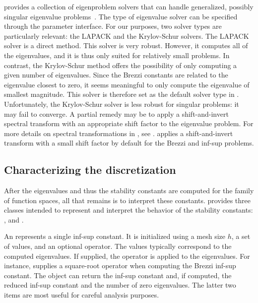 \slepc{} provides a collection of eigenproblem solvers that can handle
generalized, possibly singular eigenvalue
problems~\citep{HernandezRomanVidal2005, HernandezRomanRomeroEtAl2009}. The type
of eigenvalue solver can be specified through the \dolfin{} parameter
interface. For our purposes, two solver types are particularly
relevant: the LAPACK and the Krylov-Schur solvers.  The LAPACK solver
is a direct method. This solver is very robust. However, it computes
all of the eigenvalues, and it is thus only suited for relatively
small problems. In contrast, the Krylov-Schur method offers the
possibility of only computing a given number of eigenvalues. Since the
Brezzi constants are related to the eigenvalue closest to zero, it
seems meaningful to only compute the eigenvalue of smallest
magnitude. This solver is therefore set as the default solver type in
\rognesascot. Unfortunately, the Krylov-Schur solver is less robust
for singular problems: it may fail to converge. A partial remedy may
be to apply a shift-and-invert spectral transform with an appropriate
shift factor to the eigenvalue problem. For more details on spectral
transformations in \slepc{}, see
\citet{HernandezRomanRomeroEtAl2009}. \rognesascot{} applies a
shift-and-invert transform with a small shift factor by default for
the Brezzi and \babuska{} inf-sup problems.

\subsection{Characterizing the discretization}

After the eigenvalues and thus the stability constants are computed
for the family of function spaces, all that remains is to interpret
these constants. \rognesascot{} provides three classes intended to represent
and interpret the behavior of the stability constants:
,  and
.

An  represents a single inf-sup
constant. It is initialized using a mesh size $h$, a set of values,
and an optional operator. The values typically correspond to the
computed eigenvalues. If supplied, the operator is applied to the
eigenvalues.  For instance, \rognesascot{} supplies a square-root operator
when computing the Brezzi inf-sup constant. The object can return the
inf-sup constant and, if computed, the reduced inf-sup constant and
the number of zero eigenvalues. The latter two items are most useful
for careful analysis purposes.

